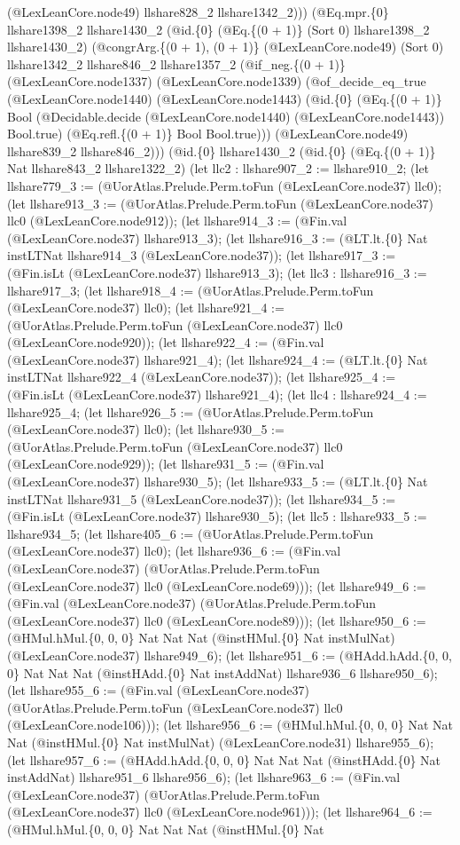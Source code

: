 \documentclass[11pt]{article}
\begin{document}
(@LexLeanCore.node49) llshare828\_2 llshare1342\_2))) (@Eq.mpr.\{0\} llshare1398\_2 llshare1430\_2 (@id.\{0\} (@Eq.\{(0 + 1)\} (Sort 0) llshare1398\_2 llshare1430\_2) (@congrArg.\{(0 + 1), (0 + 1)\} (@LexLeanCore.node49) (Sort 0) llshare1342\_2 llshare846\_2 llshare1357\_2 (@if\_neg.\{(0 + 1)\} (@LexLeanCore.node1337) (@LexLeanCore.node1339) (@of\_decide\_eq\_true (@LexLeanCore.node1440) (@LexLeanCore.node1443) (@id.\{0\} (@Eq.\{(0 + 1)\} Bool (@Decidable.decide (@LexLeanCore.node1440) (@LexLeanCore.node1443)) Bool.true) (@Eq.refl.\{(0 + 1)\} Bool Bool.true))) (@LexLeanCore.node49) llshare839\_2 llshare846\_2))) (@id.\{0\} llshare1430\_2 (@id.\{0\} (@Eq.\{(0 + 1)\} Nat llshare843\_2 llshare1322\_2) (let llc2 : llshare907\_2 := llshare910\_2; (let llshare779\_3 := (@UorAtlas.Prelude.Perm.toFun (@LexLeanCore.node37) llc0); (let llshare913\_3 := (@UorAtlas.Prelude.Perm.toFun (@LexLeanCore.node37) llc0 (@LexLeanCore.node912)); (let llshare914\_3 := (@Fin.val (@LexLeanCore.node37) llshare913\_3); (let llshare916\_3 := (@LT.lt.\{0\} Nat instLTNat llshare914\_3 (@LexLeanCore.node37)); (let llshare917\_3 := (@Fin.isLt (@LexLeanCore.node37) llshare913\_3); (let llc3 : llshare916\_3 := llshare917\_3; (let llshare918\_4 := (@UorAtlas.Prelude.Perm.toFun (@LexLeanCore.node37) llc0); (let llshare921\_4 := (@UorAtlas.Prelude.Perm.toFun (@LexLeanCore.node37) llc0 (@LexLeanCore.node920)); (let llshare922\_4 := (@Fin.val (@LexLeanCore.node37) llshare921\_4); (let llshare924\_4 := (@LT.lt.\{0\} Nat instLTNat llshare922\_4 (@LexLeanCore.node37)); (let llshare925\_4 := (@Fin.isLt (@LexLeanCore.node37) llshare921\_4); (let llc4 : llshare924\_4 := llshare925\_4; (let llshare926\_5 := (@UorAtlas.Prelude.Perm.toFun (@LexLeanCore.node37) llc0); (let llshare930\_5 := (@UorAtlas.Prelude.Perm.toFun (@LexLeanCore.node37) llc0 (@LexLeanCore.node929)); (let llshare931\_5 := (@Fin.val (@LexLeanCore.node37) llshare930\_5); (let llshare933\_5 := (@LT.lt.\{0\} Nat instLTNat llshare931\_5 (@LexLeanCore.node37)); (let llshare934\_5 := (@Fin.isLt (@LexLeanCore.node37) llshare930\_5); (let llc5 : llshare933\_5 := llshare934\_5; (let llshare405\_6 := (@UorAtlas.Prelude.Perm.toFun (@LexLeanCore.node37) llc0); (let llshare936\_6 := (@Fin.val (@LexLeanCore.node37) (@UorAtlas.Prelude.Perm.toFun (@LexLeanCore.node37) llc0 (@LexLeanCore.node69))); (let llshare949\_6 := (@Fin.val (@LexLeanCore.node37) (@UorAtlas.Prelude.Perm.toFun (@LexLeanCore.node37) llc0 (@LexLeanCore.node89))); (let llshare950\_6 := (@HMul.hMul.\{0, 0, 0\} Nat Nat Nat (@instHMul.\{0\} Nat instMulNat) (@LexLeanCore.node37) llshare949\_6); (let llshare951\_6 := (@HAdd.hAdd.\{0, 0, 0\} Nat Nat Nat (@instHAdd.\{0\} Nat instAddNat) llshare936\_6 llshare950\_6); (let llshare955\_6 := (@Fin.val (@LexLeanCore.node37) (@UorAtlas.Prelude.Perm.toFun (@LexLeanCore.node37) llc0 (@LexLeanCore.node106))); (let llshare956\_6 := (@HMul.hMul.\{0, 0, 0\} Nat Nat Nat (@instHMul.\{0\} Nat instMulNat) (@LexLeanCore.node31) llshare955\_6); (let llshare957\_6 := (@HAdd.hAdd.\{0, 0, 0\} Nat Nat Nat (@instHAdd.\{0\} Nat instAddNat) llshare951\_6 llshare956\_6); (let llshare963\_6 := (@Fin.val (@LexLeanCore.node37) (@UorAtlas.Prelude.Perm.toFun (@LexLeanCore.node37) llc0 (@LexLeanCore.node961))); (let llshare964\_6 := (@HMul.hMul.\{0, 0, 0\} Nat Nat Nat (@instHMul.\{0\} Nat 
\end{document}
